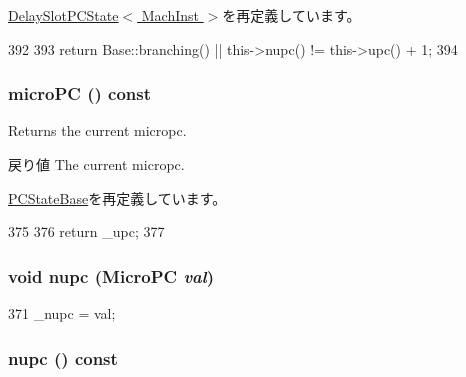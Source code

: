 \hyperlink{classGenericISA_1_1DelaySlotPCState_ae3f0eb15a9382eefff6b00cf7999c2e3}{DelaySlotPCState$<$ MachInst $>$}を再定義しています。


\begin{DoxyCode}
392     {
393         return Base::branching() || this->nupc() != this->upc() + 1;
394     }
\end{DoxyCode}
\hypertarget{classGenericISA_1_1DelaySlotUPCState_a8f0ea0df7a63b5fbf898277c4d3a1268}{
\subsubsection[{microPC}]{ microPC () const}}
\label{classGenericISA_1_1DelaySlotUPCState_a8f0ea0df7a63b5fbf898277c4d3a1268}
Returns the current micropc.

\begin{DoxyReturn}{戻り値}
The current micropc. 
\end{DoxyReturn}


\hyperlink{classGenericISA_1_1PCStateBase_a8f0ea0df7a63b5fbf898277c4d3a1268}{PCStateBase}を再定義しています。


\begin{DoxyCode}
375     {
376         return _upc;
377     }
\end{DoxyCode}
\hypertarget{classGenericISA_1_1DelaySlotUPCState_a58db0b2a7462cf953ace57aee78ac338}{
\subsubsection[{nupc}]{\setlength{\rightskip}{0pt plus 5cm}void nupc ({\bf MicroPC} {\em val})}}
\label{classGenericISA_1_1DelaySlotUPCState_a58db0b2a7462cf953ace57aee78ac338}



\begin{DoxyCode}
371 { _nupc = val; }
\end{DoxyCode}
\hypertarget{classGenericISA_1_1DelaySlotUPCState_abc005b6462dcd78d9b0cfd3f0cfe3913}{
\subsubsection[{nupc}]{ nupc () const}}
\label{classGenericISA_1_1DelaySlotUPCState_abc005b6462dcd78d9b0cfd3f0cfe3913}



